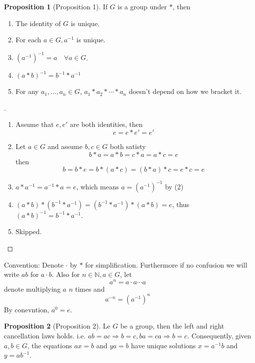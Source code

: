 \documentclass{article}
\theoremstyle{definition}
\newtheorem{prop}{Proposition}
\newenvironment{proofs}[1][\proofname]{%
  \begin{proof}[#1]$ $\par\nobreak\ignorespaces
}{%
  \end{proof}
}
\newcommand{\NN}{\mathbb N}
\newcommand{\Ra}{\Rightarrow}
\begin{document}
\begin{prop}[Proposition 1]
	If $G$ is a group under $*$, then
	\begin{enumerate}
		\item[(1)] The identity of $G$ is unique.

		\item[(2)] For each $a \in G, a^{-1}$ is unique.
			
		\item[(3)] $(a^{-1})^{-1} = a \quad \forall a \in G$.

		\item[(4)] $(a * b)^{-1} = b^{-1} * a^{-1}$

		\item[(5)] For any $a_1, ..., a_n \in G$, $a_1 * a_2 * \cdots * a_n$ doesn't depend on how we bracket it.
	\end{enumerate}
\end{prop}

\begin{proofs}
	\begin{enumerate}
		\item[(1)] Assume that $e, e'$ are both identities, then
			\[
				e = e * e' = e'
			\]

		\item[(2)] Let $a \in G$ and assume $b, c \in G$ both satisty 
			\[
				b * a = a * b = c * a = a * c = e
			\]
			then 
			\[
				b = b * e = b * (a * c) = (b * a) * c = e * c = e
			\]
			
		\item[(3)] $a * a^{-1} = a^{-1} * a = e$, which means $a = (a^{-1})^{-1}$ by (2)

		\item[(4)] $(a * b) * (b^{-1} * a^{-1}) = (b^{-1} * a^{-1}) * (a * b) = e$, thus $(a * b)^{-1} = b^{-1} * a^{-1}$.

		\item[(5)] Skipped.
	\end{enumerate}
\end{proofs}

Convention: Denote $\cdot$ by $*$ for simplification.
Furthermore if no confusion we will write $ab$ for $a \cdot b$.
Also for $n \in \NN, a \in G$, let
\[
	a^n = a \cdot a \cdots a
\]
denote multiplying $a$ $n$ times and 
\[
	a^{-n} = (a^{-1})^n
\]
By conevntion,  $a^0 = e$.

\begin{prop}[Proposition 2]
	Le $G$ be a group, then the left and right cancellation laws holds. 
	i.e. $ab = ac \Ra b = c, ba = ca \Ra b = c$.
	Consequently, given $a, b \in G$, the equations $ax = b$ and $ya = b$ have unique solutions $x = a^{-1} b$ and $y = a b^{-1}$.
\end{prop}
\end{document}
